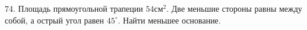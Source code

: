 74. Площадь прямоугольной трапеции $54\text{см}^2.$ Две меньшие стороны равны между собой, а острый угол равен $45^\circ.$ Найти меньшее основание.\\
